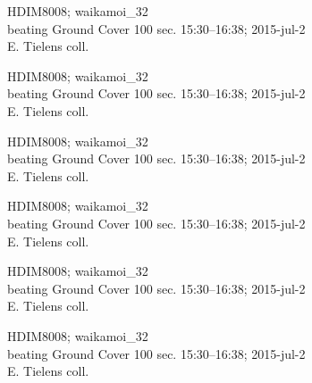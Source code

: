 \documentclass[2pt]{extarticle}
\begin{document}
\noindent
\parbox{0.16\textwidth}{\tiny \raggedright \rule[-0.3\baselineskip]{0pt}{10pt}HDIM8008; waikamoi\_32\\ beating Ground Cover 100 sec. 15:30--16:38; 2015-jul-2\\ E. Tielens coll.}
\parbox{0.16\textwidth}{\tiny \raggedright \rule[-0.3\baselineskip]{0pt}{10pt}HDIM8008; waikamoi\_32\\ beating Ground Cover 100 sec. 15:30--16:38; 2015-jul-2\\ E. Tielens coll.}
\parbox{0.16\textwidth}{\tiny \raggedright \rule[-0.3\baselineskip]{0pt}{10pt}HDIM8008; waikamoi\_32\\ beating Ground Cover 100 sec. 15:30--16:38; 2015-jul-2\\ E. Tielens coll.}
\parbox{0.16\textwidth}{\tiny \raggedright \rule[-0.3\baselineskip]{0pt}{10pt}HDIM8008; waikamoi\_32\\ beating Ground Cover 100 sec. 15:30--16:38; 2015-jul-2\\ E. Tielens coll.}
\parbox{0.16\textwidth}{\tiny \raggedright \rule[-0.3\baselineskip]{0pt}{10pt}HDIM8008; waikamoi\_32\\ beating Ground Cover 100 sec. 15:30--16:38; 2015-jul-2\\ E. Tielens coll.}
\parbox{0.16\textwidth}{\tiny \raggedright \rule[-0.3\baselineskip]{0pt}{10pt}HDIM8008; waikamoi\_32\\ beating Ground Cover 100 sec. 15:30--16:38; 2015-jul-2\\ E. Tielens coll.} \\ 
\vspace{0.001in} 
\end{document}
